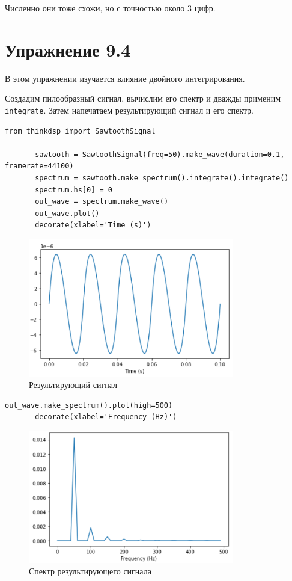 \documentclass[a4paper,12pt]{report}
\begin{document}
    Численно они тоже схожи, но с точностью около 3 цифр. 
      
\chapter{Упражнение 9.4}
    В этом упражнении изучается влияние двойного интегрирования.
            
    Создадим пилообразный сигнал, вычислим его спектр и дважды применим \texttt{integrate}. Затем напечатаем результирующий сигнал и его спектр.
\begin{lstlisting}[caption=Создание и работа с пилообразным сигналом]
       from thinkdsp import SawtoothSignal

       sawtooth = SawtoothSignal(freq=50).make_wave(duration=0.1, framerate=44100)
       spectrum = sawtooth.make_spectrum().integrate().integrate()
       spectrum.hs[0] = 0
       out_wave = spectrum.make_wave()
       out_wave.plot()
       decorate(xlabel='Time (s)')
\end{lstlisting}
\begin{figure}[H]
        \centering
        \includegraphics[width=0.8\textwidth]{fig4-1.PNG}
        \caption{Результирующий сигнал}
        \label{fig:fig4-1}
\end{figure}
\begin{lstlisting}[caption=Создание спектра результирующего сигнала]
       out_wave.make_spectrum().plot(high=500)
       decorate(xlabel='Frequency (Hz)')
\end{lstlisting} 
\begin{figure}[H]
        \centering
        \includegraphics[width=0.8\textwidth]{fig4-2.PNG}
        \caption{Спектр результирующего сигнала}
        \label{fig:fig4-2}
\end{figure} 
\end{document}

